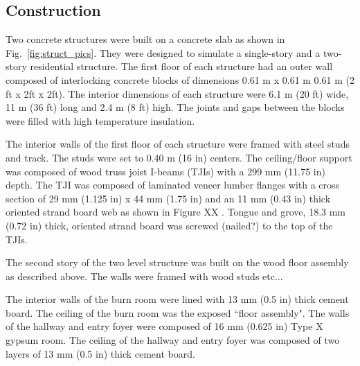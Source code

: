 \documentclass[12pt,oneside]{book}
\begin{document}
\subsection{Construction}
\label{sec:Construction}
Two concrete structures were built on a concrete slab as shown in Fig.~\ref{fig:struct_pics}. They were designed to simulate a single-story and a two-story residential structure.  The first floor of each structure had an outer wall composed of interlocking concrete blocks of dimensions 0.61 m x 0.61 m 0.61 m (2 ft x 2ft x 2ft). The interior dimensions of each structure were 6.1 m (20 ft) wide, 11 m (36 ft) long and 2.4 m (8 ft) high.  The joints and gaps between the blocks were filled with high temperature insulation.

The interior walls of the first floor of each structure were framed with steel studs and track.  The studs were set to 0.40 m (16 in) centers.  The ceiling/floor support was composed of wood truss joist I-beams (TJIs) with a 299 mm (11.75 in) depth.  The TJI was composed of laminated veneer lumber flanges with a cross section of 29 mm (1.125 in) x 44 mm (1.75 in) and an 11 mm (0.43 in) thick oriented strand board web as shown in Figure  XX .  Tongue and grove, 18.3 mm (0.72 in) thick, oriented strand board was screwed (nailed?) to the top of the TJIs.

The second story of the two level structure was built on the wood floor assembly as described above. The walls were framed with wood studs etc...

The interior walls of the burn room were lined with 13 mm (0.5 in) thick cement board.  The ceiling of the burn room was the exposed ``floor assembly".  The walls of the hallway and entry foyer were composed of 16 mm (0.625 in) Type X gypsum room. The ceiling of the hallway and entry foyer was composed of two layers of 13 mm (0.5 in) thick cement board.  
\end{document}
